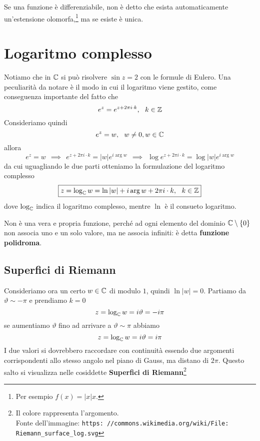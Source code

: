 \begin{thm}
Se una funzione è differenziabile, non è detto che esista automaticamente un'estensione olomorfa,\footnote{Per esempio $f(x) =| x| x$.} ma se esiste è unica.
\end{thm}

\section{Logaritmo complesso}

Notiamo che in $\mathbb{C}$ si può risolvere $\sin z = 2$ con le formule di Eulero. Una peculiarità da notare è il modo in cui il logaritmo viene gestito, come conseguenza importante del fatto che
\begin{equation*}
e^{z} = e^{z + 2\pi i\cdot k}, \ \ k\in \mathbb{Z}
\end{equation*}
Consideriamo quindi
\begin{equation*}
e^{z} = w, \ \ w\neq 0, w\in \mathbb{C}
\end{equation*}
allora
\begin{equation*}
e^{z} = w\ \ \implies \ \ e^{z + 2\pi i\cdot k} =| w| e^{i\arg w} \ \ \implies \ \ \log e^{z + 2\pi i\cdot k} = \log| w| e^{i\arg w}
\end{equation*}
da cui uguagliando le due parti otteniamo la formulazione del logaritmo complesso
\begin{equation*}
\boxed{z = \log_{\mathbb{C}} w = \ln| w| + i\arg w + 2\pi i\cdot k, \ \ k\in \mathbb{Z}}
\end{equation*}
dove $\log_{\mathbb{C}}$ indica il logaritmo complesso, mentre $\ln$ è il consueto logaritmo.

Non è una vera e propria funzione, perché ad ogni elemento del dominio $\mathbb{C} \setminus \{0\}$ non associa uno e un solo valore, ma ne associa infiniti: è detta \textbf{funzione polidroma}.

\subsection{Superfici di Riemann}

Consideriamo ora un certo $w\in \mathbb{C}$ di modulo $1$, quindi $\ln| w| = 0$. Partiamo da $\vartheta \sim - \pi $ e prendiamo $k = 0$
\begin{equation*}
z = \log_{\mathbb{C}} w = i\vartheta = - i\pi
\end{equation*}
se aumentiamo $\vartheta $ fino ad arrivare a $\vartheta \sim \pi $ abbiamo
\begin{equation*}
z = \log_{\mathbb{C}} w = i\vartheta = i\pi
\end{equation*}
I due valori si dovrebbero raccordare con continuità essendo due argomenti corrispondenti allo stesso angolo nel piano di Gauss, ma distano di $2\pi $. Questo salto si visualizza nelle cosiddette \textbf{Superfici di Riemann}\footnote{Il colore rappresenta l'argomento.\\Fonte dell'immagine: \texttt{https: //commons.wikimedia.org/wiki/File: Riemann\_surface\_log.svg}}

